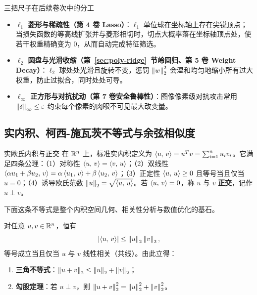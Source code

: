 \begin{insightBox}{三把尺子在后续卷次中的分工}
\begin{itemize}
  \item \textbf{$\ell_1$ 菱形与稀疏性（第 4 卷 Lasso）}：$\ell_1$ 单位球在坐标轴上存在尖锐顶点；当损失函数的等高线扩张并与菱形相切时，切点大概率落在坐标轴顶点处，使若干权重精确变为 $0$，从而自动完成特征筛选。
  \item \textbf{$\ell_2$ 圆盘与光滑收缩（第~\ref{sec:poly-ridge}~节岭回归、第 5 卷 Weight Decay）}：$\ell_2$ 球处处光滑且旋转不变，惩罚 $\left\|w\right\|_2^2$ 会温和均匀地缩小所有过大权重，防止过拟合，同时处处可导。
  \item \textbf{$\ell_\infty$ 正方形与对抗扰动（第 7 卷安全鲁棒性）}：图像像素级对抗攻击常用 $\left\|\delta\right\|_\infty \le \varepsilon$ 约束每个像素的肉眼不可见最大改变量。
\end{itemize}
\end{insightBox}

\subsection{实内积、柯西-施瓦茨不等式与余弦相似度}

\begin{recallBox}{实欧氏内积与正交}
在 $\mathbb{R}^n$ 上，标准实内积定义为 $\left\langle u,\, v \right\rangle = u^T v = \sum_{i=1}^n u_i v_i$。它满足四条公理：（1）对称性 $\left\langle u,\, v \right\rangle = \left\langle v,\, u \right\rangle$；（2）双线性 $\left\langle \alpha u_1 + \beta u_2,\, v \right\rangle = \alpha\left\langle u_1,\, v \right\rangle + \beta\left\langle u_2,\, v \right\rangle$；（3）正定性 $\left\langle u,\, u \right\rangle \ge 0$ 且等号当且仅当 $u=0$；（4）诱导欧氏范数 $\left\|u\right\|_2 = \sqrt{\left\langle u,\, u \right\rangle}$。若 $\left\langle u,\, v \right\rangle = 0$，称 $u$ 与 $v$ \textbf{正交}，记作 $u \perp v$。
\end{recallBox}

下面这条不等式是整个内积空间几何、相关性分析与数值优化的基石。

\begin{thmBox}
\begin{theorem}\label{thm:cauchy-schwarz}
对任意 $u, v \in \mathbb{R}^n$，恒有
\begin{equation}\label{eq:cs}
\left|\left\langle u,\, v \right\rangle\right| \le \left\|u\right\|_2 \left\|v\right\|_2,
\end{equation}
等号成立当且仅当 $u$ 与 $v$ 线性相关（共线）。由此立得：
\begin{enumerate}
  \item \textbf{三角不等式}：$\left\|u + v\right\|_2 \le \left\|u\right\|_2 + \left\|v\right\|_2$；
  \item \textbf{勾股定理}：若 $u \perp v$，则 $\left\|u + v\right\|_2^2 = \left\|u\right\|_2^2 + \left\|v\right\|_2^2$。
\end{enumerate}
\end{theorem}
\end{thmBox}

